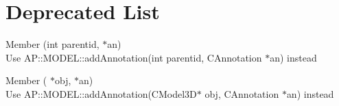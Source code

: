 \chapter{Deprecated List}
\hypertarget{deprecated}{}\label{deprecated}

\begin{DoxyRefList}
\item[Member \doxylink{namespace_a_p_a326dfebff420e1049fea4267f5dcf7cc}{AP\+::add\+Annotation} (int parentid, \doxylink{class_c_annotation}{CAnnotation} \texorpdfstring{$\ast$}{*}an)]\hfill \\
\label{deprecated__deprecated000001}%
%
Use AP\+::\+MODEL\+::add\+Annotation(int parentid, CAnnotation \texorpdfstring{$\ast$}{*}an) instead  
\item[Member \doxylink{namespace_a_p_a51d4df51a94f517ce115d11d065363f4}{AP\+::add\+Annotation} (\doxylink{class_c_model3_d}{CModel3D} \texorpdfstring{$\ast$}{*}obj, \doxylink{class_c_annotation}{CAnnotation} \texorpdfstring{$\ast$}{*}an)]\hfill \\
\label{deprecated__deprecated000002}%
%
Use AP\+::\+MODEL\+::add\+Annotation(\+CModel3\+D\texorpdfstring{$\ast$}{*} obj, CAnnotation \texorpdfstring{$\ast$}{*}an) instead 
\end{DoxyRefList}